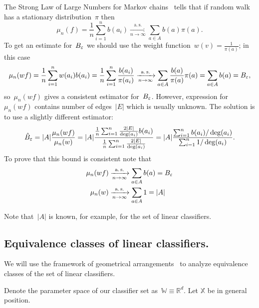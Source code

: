 \documentclass{article}
\let\cite\citep
\def\AA{A}
\def\RR{\mathbb{R}}
\def\XX{\mathbb{X}}
\def\WW{\mathbb{W}}
\begin{document}
The Strong Law of Large Numbers for Markov chains~\cite{roberts2004markovchains} tells that
if random walk has a stationary distribution~$\pi$ then
\[
    \mu_n(f)
    =
    \frac{1}{n}
    \sum_{i = 1}^{n}
        b(a_i)
    \xrightarrow[n \to \infty]{\mathrm{a.\,s.}}
    \sum_{a \in \AA}
        b(a) \pi(a).
\]
To get an estimate for~$B_\varepsilon$ we should use the weight function~$w(v) = \frac{1}{\pi(a)}$;
in this case
\[
    \mu_n(w f)
    =
    \frac{1}{n}
    \sum_{i = 1}^{n}
        w(a_i) b(a_i)
    =
    \frac{1}{n}
    \sum_{i = 1}^{n}
        \frac{b(a_i)}{\pi(a_i)}
    \xrightarrow[n \to \infty]{\mathrm{a.\,s.}}
    \sum_{a \in \AA}
        \frac{b(a)}{\pi(a)} \pi(a)
    =
    \sum_{a \in \AA}
        b(a)
    =
    B_\eps,
\]
so~$\mu_n(w f)$ gives a consistent estimator for~$B_\varepsilon$.
However, expression for~$\mu_n(w f)$ contains number of edges~$|E|$
which is usually unknown.
The solution is to use a slightly different estimator:
\begin{equation*}
    \hat B_\eps
    =
    |\AA|
    \frac{\mu_n (w f)}{\mu_n(w)}
    =
    |\AA|
    \frac{
        \frac{1}{n}
        \sum_{i = 1}^{n}
            \frac{2 |E|}{\deg(a_i)}
            b(a_i)
    }{
        \frac{1}{n}
        \sum_{i = 1}^{n}
            \frac{2 |E|}{\deg(a_i)}
    }
    =
    |\AA|
    \frac{
        \sum_{i = 1}^{n} b(a_i) / \deg(a_i)
    }{
        \sum_{i = 1}^{n} 1 / \deg(a_i)
    }.
\end{equation*}
To prove that this bound is consistent note that
\begin{align*}
    \mu_n (w f)
        &\xrightarrow[n \to \infty]{\mathrm{a.\,s.}}
        \sum_{a \in \AA} b(a)
        =
        B_\eps \\
    \mu_n(w)
    	&\xrightarrow[n \to \infty]{\mathrm{a.\,s.}}
    	\sum_{a \in \AA} 1
    	=
    	|\AA|
\end{align*}

Note that~$|\AA|$ is known, for example, for the set of linear classifiers.

\subsection{Equivalence classes of linear classifiers.}
We will use the framework of geometrical arrangements~\cite{agarwal98arrangements}
to analyze equivalence classes of the set of linear classifiers.

Denote the parameter space of our classifier set as~$\WW \equiv \RR^d$.
Let $\XX$ be in general position.
\end{document}
